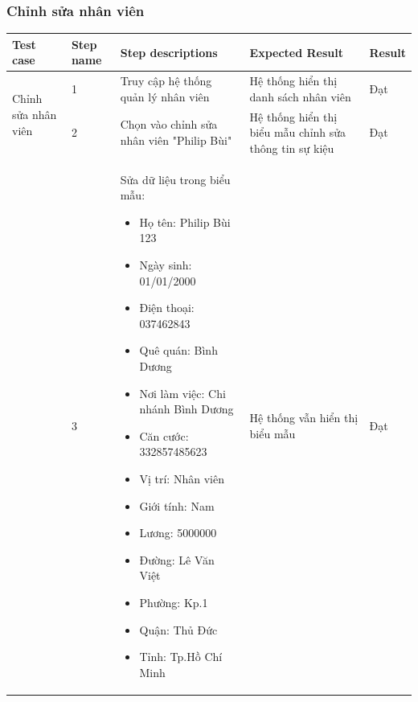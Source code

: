 \subsubsection{Chỉnh sửa nhân viên}
{
    \setlength\extrarowheight{6pt}
    \begin{longtable}{| p{2.5cm}| p{1cm}| p{5.5cm}| p{4.5cm} | p{1.5cm} |}
        \hline
        \textbf{Test case}                          & \textbf{Step name}             & \textbf{Step descriptions}                & \textbf{Expected Result}                               & \textbf{Result} \\
        \hline
        \multirow[t]{2}{2.5cm}{Chỉnh sửa nhân viên} & 1                              & Truy cập hệ thống quản lý nhân viên       & Hệ thống hiển thị danh sách nhân viên                  & Đạt             \\
        \cline{2-5}
                                                    & 2                              & Chọn vào chỉnh sửa nhân viên "Philip Bùi" & Hệ thống hiển thị biểu mẫu chỉnh sửa thông tin sự kiệu & Đạt             \\
        \cline{2-5}
                                                    & 3                              & Sửa dữ liệu trong biểu mẫu:
        \begin{itemize}
            \item Họ tên: Philip Bùi 123
            \item Ngày sinh: 01/01/2000
            \item Điện thoại: 037462843
            \item Quê quán: Bình Dương
            \item Nơi làm việc: Chi nhánh Bình Dương
            \item Căn cước: 332857485623
            \item Vị trí: Nhân viên
            \item Giới tính: Nam
            \item Lương: 5000000
            \item Đường: Lê Văn Việt
            \item Phường: Kp.1
            \item Quận: Thủ Đức
            \item Tỉnh: Tp.Hồ Chí Minh
        \end{itemize}    & Hệ thống vẫn hiển thị biểu mẫu & Đạt                                                                                                                                             \\

\end{longtable}}
